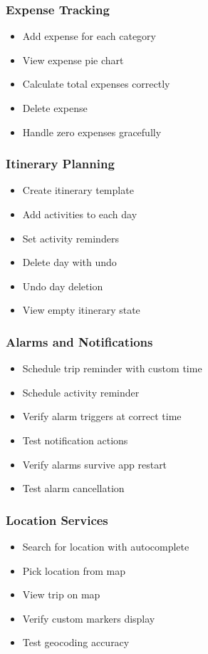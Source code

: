 \documentclass[12pt,a4paper]{article}
\begin{document}
\subsubsection{Expense Tracking}
\begin{itemize}
    \item Add expense for each category
    \item View expense pie chart
    \item Calculate total expenses correctly
    \item Delete expense
    \item Handle zero expenses gracefully
\end{itemize}

\subsubsection{Itinerary Planning}
\begin{itemize}
    \item Create itinerary template
    \item Add activities to each day
    \item Set activity reminders
    \item Delete day with undo
    \item Undo day deletion
    \item View empty itinerary state
\end{itemize}

\subsubsection{Alarms and Notifications}
\begin{itemize}
    \item Schedule trip reminder with custom time
    \item Schedule activity reminder
    \item Verify alarm triggers at correct time
    \item Test notification actions
    \item Verify alarms survive app restart
    \item Test alarm cancellation
\end{itemize}

\subsubsection{Location Services}
\begin{itemize}
    \item Search for location with autocomplete
    \item Pick location from map
    \item View trip on map
    \item Verify custom markers display
    \item Test geocoding accuracy
\end{itemize}
\end{document}
